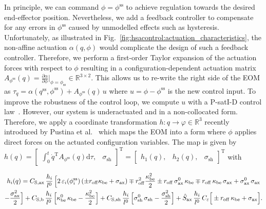 In principle, we can command $\phi = \phi^\mathrm{ss}$ to achieve regulation towards the desired end-effector position.
Nevertheless, we add a feedback controller to compensate for any errors in $\phi^\mathrm{ss}$ caused by unmodelled effects such as hysteresis. Unfortunately, as illustrated in Fig.~\ref{fig:hsacontrol:actuation_characteristics}, the non-affine actuation $\alpha(q,\phi)$ would complicate the design of such a feedback controller.
Therefore, we perform a first-order Taylor expansion of the actuation forces with respect to $\phi$ resulting in a configuration-dependent actuation matrix $A_{\phi^\mathrm{ss}}(q) = \frac{\partial \alpha}{\partial \phi} \big|_{\phi = \phi_\mathrm{ss}} \in \mathbb{R}^{3 \times 2}$. This allows us to re-write the right side of the \gls{EOM} as $\tau_q = \alpha(q^\mathrm{ss}, \phi^\mathrm{ss}) + A_{\phi^\mathrm{ss}}(q) \, u$ where $u = \phi - \phi^\mathrm{ss}$ is the new control input.
To improve the robustness of the control loop, we compute $u$ with a P-satI-D control law~\cite{pustina2022p}. However, our system is underactuated and in a non-collocated form.
Therefore, we apply a coordinate transformation $h: q \rightarrow \varphi \in \mathbb{R}^3$ recently introduced by Pustina et al.~\cite{pustina2024input} which maps the \gls{EOM} into a form where $\phi$ applies direct forces on the actuated configuration variables. The map is given by { $h(q) = \begin{bmatrix}
    \int_0^t \dot{q}^\mathrm{T} A_{\phi^\mathrm{ss}}(q) \mathrm{d}\tau, & \sigma_\mathrm{sh}
\end{bmatrix}^\mathrm{T} = \begin{bmatrix}
    h_1(q), & h_2(q), & \sigma_\mathrm{sh}
\end{bmatrix}^\mathrm{T}$}
with
\begin{footnotesize}
\begin{multline}\footnotesize
    h_i(q) = 
    C_{\mathrm{S},\mathrm{ax}} \, \frac{h_i}{l^0} \, \Big [ 2 \, \varepsilon_i(\phi^\mathrm{ss}_i) \left ( \pm r_\mathrm{off} \kappa_\mathrm{be} + \sigma_\mathrm{ax} \right ) \mp r_\mathrm{off}^2 \frac{\kappa_\mathrm{be}^2}{2} \pm r_\mathrm{off} \, \sigma_\mathrm{ax}^0 \, \kappa_\mathrm{be} \mp r_\mathrm{off} \, \kappa_\mathrm{be} \, \sigma_\mathrm{ax} + \sigma_\mathrm{ax}^0 \, \sigma_\mathrm{ax}\\ - \frac{\sigma_\mathrm{ax}^2}{2} \Big ] 
    + C_{\mathrm{S},\mathrm{b}} \, \frac{h_i}{l^0} \, \Big [ \kappa_\mathrm{be}^0 \, \kappa_\mathrm{be} - \frac{\kappa_\mathrm{be}^2}{2} \Big ] 
    + C_{\mathrm{S},\mathrm{sh}} \, \frac{h_i}{l^0} \, \Big [\sigma_\mathrm{sh}^0 \, \sigma_\mathrm{sh} - \frac{\sigma_\mathrm{sh}^2}{2} \Big ]
    + \hat{S}_\mathrm{ax} \, \frac{h_i}{l^0} \, C_\varepsilon \Big [ \pm r_\mathrm{off} \, \kappa_\mathrm{be} + \sigma_\mathrm{ax} \Big ].
\end{multline}
\end{footnotesize}
